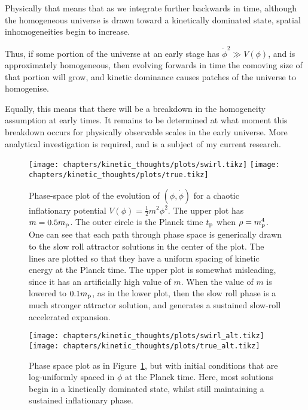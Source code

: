 Physically that means that as we integrate further backwards in time, although the homogeneous universe is drawn toward a kinetically dominated state, spatial inhomogeneities begin to increase.

Thus, if some portion of the universe at an early stage has \(\dot{\phi}^2 \gg V(\phi)\), and is approximately homogeneous, then evolving forwards in time the comoving size of that portion will grow, and kinetic dominance causes patches of the universe to homogenise.

Equally, this means that there will be a breakdown in the homogeneity assumption at early times. It remains to be determined at what moment this breakdown occurs for physically observable scales in the early universe. More analytical investigation is required, and is a subject of my current research.


\begin{figure}[tp]
  \centering
  \texttt{[image: chapters/kinetic\_thoughts/plots/swirl.tikz]}
  \texttt{[image: chapters/kinetic\_thoughts/plots/true.tikz]}
  \caption{Phase-space plot of the evolution of \((\phi,\dot{\phi})\) for a chaotic inflationary potential \(V(\phi) = \frac{1}{2}m^2 \phi^2\). The upper plot has \(m=0.5m_{\mathrm{p}}\). The outer circle is the Planck time \(t_{\mathrm{p}}\) when \(\rho=m_{\mathrm{p}}^4\). One can see that each path through phase space is generically drawn to the slow roll attractor solutions in the center of the plot. The lines are plotted so that they have a uniform spacing of kinetic energy at the Planck time.  The upper plot is somewhat misleading, since it has an artificially high value of \(m\). When the value of \(m\) is lowered to \(0.1m_{\mathrm{p}}\), as in the lower plot, then the slow roll phase is a much stronger attractor solution, and generates a sustained slow-roll accelerated expansion.}\label{fig:kt:linde}
\end{figure}

\begin{figure}[tp]
  \centering
  \texttt{[image: chapters/kinetic\_thoughts/plots/swirl\_alt.tikz]}
  \texttt{[image: chapters/kinetic\_thoughts/plots/true\_alt.tikz]}
  \caption{Phase space plot as in Figure~\protect\ref{fig:kt:linde}, but with initial conditions that are log-uniformly spaced in \(\phi\) at the Planck time. Here, most solutions begin in a kinetically dominated state, whilst still maintaining a sustained inflationary phase.}\label{fig:kt:alternate}
\end{figure}
